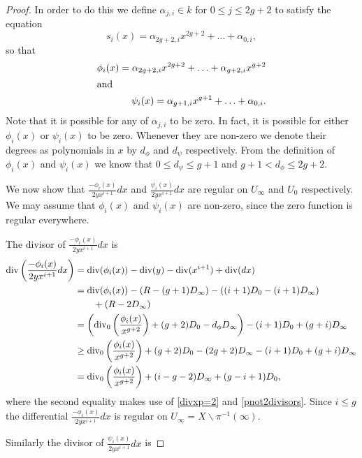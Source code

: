 \begin{proof}
    
    In order to do this we define $\alpha_{j,i} \in k$ for $0\leq j \leq 2g+2$ to satisfy the equation
        \[
        s_i(x) = \alpha_{2g+2,i}x^{2g+2} + \ldots + \alpha_{0,i},
        \]
    so that
        \begin{align*}
        \phi_i(x) = \alpha_{2g+2,i}x^{2g+2} + \ldots + \alpha_{g+2,i}x^{g+2} \\
        \intertext{and }
        \psi_i(x) = \alpha_{g+1,i}x^{g+1} + \ldots + \alpha_{0,i}.
        \end{align*}
    Note that it is possible for any of $\alpha_{j,i}$ to be zero. In fact, it is possible for either $\phi_i(x)$ or $\psi_i(x)$ to be zero.
    Whenever they are non-zero we denote their degrees as polynomials in $x$ by $d_\phi$ and $d_\psi$ respectively. From the definition of $\phi_i(x)$ and $\psi_i(x)$ we know that $0 \leq d_\psi \leq g+1$ and $g+1 < d_\phi \leq 2g+2$.
    
    
    We now show that $\frac{-\phi_i(x)}{2yx^{i+1}}dx$ and $\frac{\psi_i(x)}{2yx^{i+1}}dx$ are regular on $U_\infty$ and $U_0$ respectively.
    We may assume that $\phi_i(x)$ and $\psi_i(x)$ are non-zero, since the zero function is regular everywhere.
    
    
    The divisor of $\frac{-\phi_i(x)}{2yx^{i+1}}dx$ is
        \begin{align*}
        \operatorname{div}\left( \frac{-\phi_i(x)}{2yx^{i+1}}dx \right) & =  \operatorname{div}(\phi_i(x)) -\operatorname{div}(y) - \operatorname{div}(x^{i+1}) + \operatorname{div} (dx) \\
        & =  \operatorname{div}(\phi_i(x)) - ( R - (g+1)D_\infty) - ((i+1)D_0 - (i+1)D_\infty) \\
        & \qquad + (R - 2D_\infty) \\
        & =  \left( \operatorname{div}_0\left( \frac{\phi_i(x)}{x^{g+2}}\right) + (g+2)D_0 - d_\phi D_\infty\right) - (i+1)D_0 + (g+i)D_\infty \\
        & \geq  \operatorname{div}_0\left( \frac{\phi_i(x)}{x^{g+2}}\right) + (g+2)D_0 - (2g+2)D_\infty - (i+1)D_0 + (g+i)D_\infty \\
        & =  \operatorname{div}_0\left( \frac{\phi_i(x)}{x^{g+2}} \right) + (i-g-2)D_\infty + (g-i+1)D_0,
        \end{align*}
    where the second equality makes use of \eqref{divxp=2} and \eqref{pnot2divisors}.
    Since $i \leq g$ the differential $\frac{-\phi_i(x)}{2yx^{i+1}}dx$ is regular on $U_\infty = X\backslash \pi^{-1}(\infty)$.
    
    Similarly the divisor of $\frac{\psi_i(x)}{2yx^{i+1}}dx$ is
    

\end{proof}
